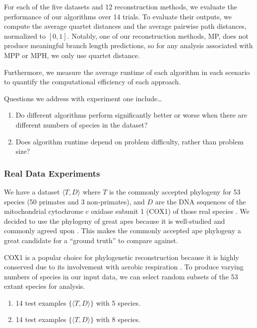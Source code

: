 \documentclass[10pt,twocolumn]{article}
\begin{document}
For each of the five datasets and 12 reconstruction methods, we evaluate the performance of our
algorithms over 14 trials. To evaluate their outputs, we compute the average
quartet distances and the average pairwise path distances, normalized to $[0, 1]$.
Notably, one of our reconstruction methods, MP, does not produce meaningful branch length
predictions, so for any analysis associated with MPP or MPH, we only use quartet distance.

Furthermore, we measure the average runtime of each algorithm in each scenario to quantify
the computational efficiency of each approach.

Questions we address with experiment one include\ldots
\begin{enumerate}
  \item Do different algorithms perform significantly better or worse when there are different numbers of species in the dataset?
  \item Does algorithm runtime depend on problem difficulty, rather than problem size?
\end{enumerate}

\subsubsection*{Real Data Experiments}
We have a dataset $\langle T, D \rangle$ where $T$ is the commonly accepted phylogeny
for 53 species (50 primates and 3 non-primates), and $D$ are the DNA sequences of the
mitochondrial cytochrome c oxidase 
subunit 1 (COX1) of those real species \cite{perelman2011molecular}. We decided to use the phylogeny of
great apes because it is well-studied and commonly agreed upon \cite{perelman2011molecular}. This makes the commonly accepted
ape phylogeny a great candidate for a ``ground truth'' to compare against.

COX1 is a popular choice for phylogenetic reconstruction 
because it is highly conserved due to its involvement with aerobic respiration \cite{oxidase2009electron}.
To produce varying numbers of species in our input data, we
can select random subsets of the 53 extant species for analysis.

\begin{enumerate}
  \item 14 test examples $\{\langle T, D \rangle\}$ with 5 species.
  \item 14 test examples $\{\langle T, D \rangle\}$ with 8 species.
\end{enumerate}
\end{document}
